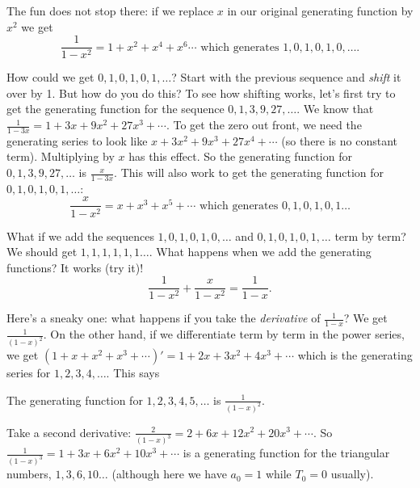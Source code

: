 \documentclass[10pt,]{book}
\theoremstyle{plain}
\theoremstyle{definition}
\theoremstyle{definition}
\theoremstyle{definition}
\theoremstyle{definition}
\numberwithin{equation}{chapter}
\def\d{\displaystyle}
\begin{document}
\hypertarget{p-1078}{}%
The fun does not stop there: if we replace \(x\) in our original generating function by \(x^2\) we get%
\begin{equation*}
\frac{1}{1-x^2} = 1 + x^2  + x^4 + x^6\cdots \mbox{ which generates }  1, 0, 1, 0, 1, 0, \ldots.
\end{equation*}
%
\par
\hypertarget{p-1079}{}%
How could we get \(0,1,0,1,0,1,\ldots\)? Start with the previous sequence and \emph{shift} it over by 1. But how do you do this? To see how shifting works, let's first try to get the generating function for the sequence \(0, 1, 3, 9, 27, \ldots\). We know that \(\frac{1}{1-3x} = 1 + 3x + 9x^2 + 27x^3 + \cdots\). To get the zero out front, we need the generating series to look like \(x + 3x^2 + 9x^3 + 27x^4+ \cdots\) (so there is no constant term). Multiplying by \(x\) has this effect. So the generating function for \(0, 1, 3, 9, 27, \ldots\) is \(\frac{x}{1-3x}\). This will also work to get the generating function for \(0,1,0,1,0,1,\ldots\):%
\begin{equation*}
\frac{x}{1-x^2} = x + x^3 + x^5 + \cdots \mbox{ which generates }  0, 1, 0, 1, 0 , 1 \ldots
\end{equation*}
%
\par
\hypertarget{p-1080}{}%
What if we add the sequences \(1,0,1,0,1,0,\ldots\) and \(0,1,0,1,0,1,\ldots\) term by term? We should get \(1,1,1,1,1,1\ldots\). What happens when we add the generating functions? It works (try it)!%
\begin{equation*}
\frac{1}{1-x^2} + \frac{x}{1-x^2} = \frac{1}{1-x}.
\end{equation*}
%
\par
\hypertarget{p-1081}{}%
Here's a sneaky one: what happens if you take the \emph{derivative} of \(\frac{1}{1-x}\)? We get \(\frac{1}{(1-x)^2}\). On the other hand, if we differentiate term by term in the power series, we get \((1 + x + x^2 + x^3 + \cdots)' = 1 + 2x + 3x^2 + 4x^3 + \cdots\) which is the generating series for \(1, 2, 3, 4, \ldots\). This says%
\begin{assemblage}[\(1,2,3,\ldots\)]\label{assemblage-13}
\hypertarget{p-1082}{}%
The generating function for \(1, 2, 3, 4, 5, \ldots\) is \(\d\frac{1}{(1-x)^2}.\)%
\end{assemblage}
\hypertarget{p-1083}{}%
Take a second derivative: \(\frac{2}{(1-x)^3} = 2 + 6x + 12x^2 + 20x^3 + \cdots\). So \(\frac{1}{(1-x)^3} = 1 + 3x + 6x^2 + 10x^3 + \cdots\) is a generating function for the triangular numbers, \(1,3,6,10\ldots\) (although here we have \(a_0 = 1\) while \(T_0 = 0\) usually).%
\typeout{************************************************}
\typeout{************************************************}
\end{document}
